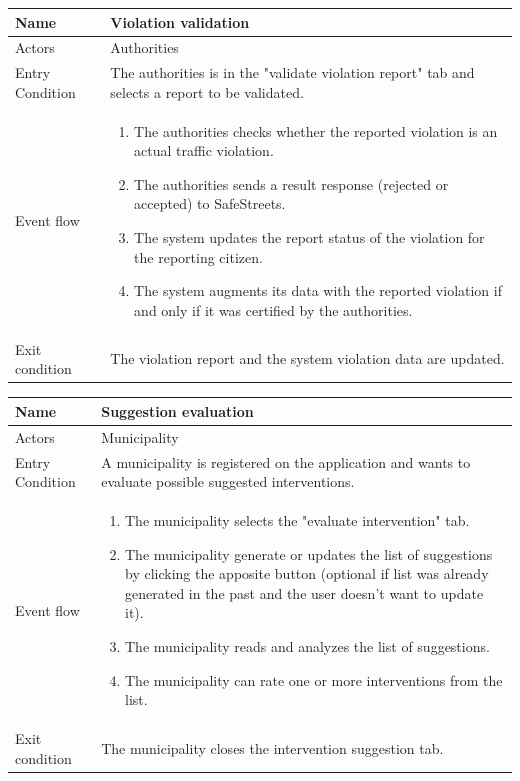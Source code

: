 \vskip 0.2in
\begin{tabular}{|p{3.1cm}|p{11.6cm}|}
\hline
Name & Violation validation\\
\hline
Actors & Authorities\\
\hline
Entry Condition & The authorities is in the "validate violation report" tab and selects a report to be validated.\\
\hline
Event flow & \begin{enumerate}
                \item The authorities checks whether the reported violation is an actual traffic violation.
                \item The authorities sends a result response (rejected or accepted) to SafeStreets.
                \item The system updates the report status of the violation for the reporting citizen.
                \item The system augments its data with the reported violation if and only if it was certified by the authorities.
            \end{enumerate}\\
\hline
Exit condition & The violation report and the system violation data are updated.\\
\hline
\end{tabular}

\vskip 0.2in
\begin{tabular}{|p{3.1cm}|p{11.6cm}|}
\hline
Name & Suggestion evaluation\\
\hline
Actors & Municipality\\
\hline
Entry Condition & A municipality is registered on the application and wants to evaluate possible suggested interventions.\\
\hline
Event flow & \begin{enumerate}
			\item The municipality selects the "evaluate intervention" tab.
			\item The municipality generate or updates the list of suggestions by clicking the apposite button (optional if list was already generated in the past and the user doesn't want to update it).
			\item The municipality reads and analyzes the list of suggestions.
			\item The municipality can rate one or more interventions from the list.
            \end{enumerate}\\
\hline
Exit condition & The municipality closes the intervention suggestion tab.\\
\hline
\end{tabular}

